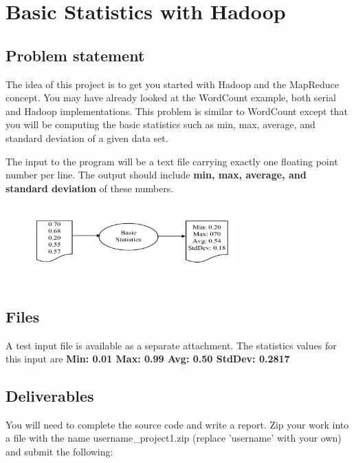 \FILENAME

\section*{Basic Statistics with Hadoop}       

\subsection*{Problem statement}
 
The idea of this project is to get you started with Hadoop and the MapReduce concept. You may have already looked at the WordCount example, both serial and Hadoop implementations. This problem is similar to WordCount except that you will be computing the basic statistics such as min, max, average, and standard deviation of a given data set.

The input to the program will be a text file carrying exactly one floating point number per line. The output should include \textbf{min, max, average, and standard deviation} of these numbers.

\begin{figure}[!htbp]
\includegraphics[width=8cm,height=3cm]{section/icloud/assignment/problems/project1/p1example.png}
\centering
\end{figure}

\subsection*{Files}
A test input file is available as a separate attachment.
The statistics values for this input are \textbf{Min: 0.01 Max: 0.99 Avg: 0.50 StdDev: 0.2817}


\subsection*{Deliverables}

You will need to complete the source code and write a report. Zip your work into a file with the name username\_project1.zip (replace 'username' with your own) and submit the following:

